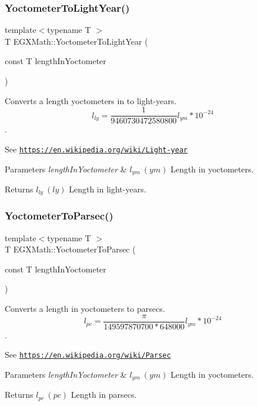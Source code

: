 \subsubsection{\texorpdfstring{Yoctometer\+To\+Light\+Year()}{YoctometerToLightYear()}}
{\footnotesize\ttfamily template$<$typename T $>$ \\
T E\+G\+X\+Math\+::\+Yoctometer\+To\+Light\+Year (\begin{DoxyParamCaption}\item[{const T}]{length\+In\+Yoctometer }\end{DoxyParamCaption})}



Converts a length yoctometers in to light-\/years. \[ l_{ly}= \frac{1}{9460730472580800} l_{ym} * 10^{-24} \]. 

See \href{https://en.wikipedia.org/wiki/Light-year}{\tt https\+://en.\+wikipedia.\+org/wiki/\+Light-\/year} 
\begin{DoxyParams}{Parameters}
{\em length\+In\+Yoctometer} & $ l_{ym}\ (ym)$ Length in yoctometers. \\
\hline
\end{DoxyParams}
\begin{DoxyReturn}{Returns}
$ l_{ly}\ (ly)$ Length in light-\/years. 
\end{DoxyReturn}
\mbox{\label{group___e_g_x_math-_conversions-_length_conversions-_s_i-_yoctometer-_astronomical_ga6856c1dd6b2d31388b4138dcb03bd8ce}} 
\subsubsection{\texorpdfstring{Yoctometer\+To\+Parsec()}{YoctometerToParsec()}}
{\footnotesize\ttfamily template$<$typename T $>$ \\
T E\+G\+X\+Math\+::\+Yoctometer\+To\+Parsec (\begin{DoxyParamCaption}\item[{const T}]{length\+In\+Yoctometer }\end{DoxyParamCaption})}



Converts a length in yoctometers to parsecs. \[ l_{pc}=\frac{\pi}{149597870700 * 648000} l_{ym} * 10^{-24} \]. 

See \href{https://en.wikipedia.org/wiki/Parsec}{\tt https\+://en.\+wikipedia.\+org/wiki/\+Parsec} 
\begin{DoxyParams}{Parameters}
{\em length\+In\+Yoctometer} & $ l_{ym}\ (ym)$ Length in yoctometers. \\
\hline
\end{DoxyParams}
\begin{DoxyReturn}{Returns}
$ l_{pc}\ (pc)$ Length in parsecs. 
\end{DoxyReturn}
